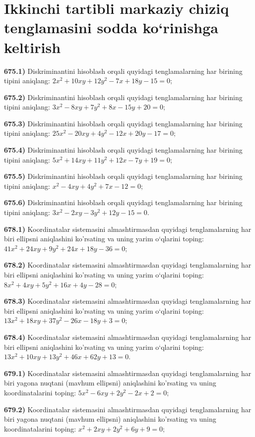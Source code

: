 \section{Ikkinchi tartibli markaziy chiziq tenglamasini sodda ko‘rinishga keltirish}



\textbf{675.1)} Diskriminantini hisoblash orqali quyidagi tenglamalarning har birining tipini aniqlang: $2 x^2+10 x y+12 y^2-7 x+18 y-15=0$;

\textbf{675.2)} Diskriminantini hisoblash orqali quyidagi tenglamalarning har birining tipini aniqlang: $3 x^2-8 x y+7 y^2+8 x-15 y+20=0$;

\textbf{675.3)} Diskriminantini hisoblash orqali quyidagi tenglamalarning har birining tipini aniqlang: $25 x^2-20 x y+4 y^2-12 x+20 y-17=0$;

\textbf{675.4)} Diskriminantini hisoblash orqali quyidagi tenglamalarning har birining tipini aniqlang: $5 x^2+14 x y+11 y^2+12 x-7 y+19=0$;

\textbf{675.5)} Diskriminantini hisoblash orqali quyidagi tenglamalarning har birining tipini aniqlang: $x^2-4 x y+4 y^2+7 x-12=0$;

\textbf{675.6)} Diskriminantini hisoblash orqali quyidagi tenglamalarning har birining tipini aniqlang: $3 x^2-2 x y-3 y^2+12 y-15=0$.

\textbf{678.1)} Koordinatalar sistemasini almashtirmasdan quyidagi tenglamalarning har biri ellipsni aniqlashini ko'rsating va uning yarim o‘qlarini toping: $41 x^2+24 x y+9 y^2+24 x+18 y-36=0$;

\textbf{678.2)} Koordinatalar sistemasini almashtirmasdan quyidagi tenglamalarning har biri ellipsni aniqlashini ko'rsating va uning yarim o‘qlarini toping: $8 x^2+4 x y+5 y^2+16 x+4 y-28=0$;

\textbf{678.3)} Koordinatalar sistemasini almashtirmasdan quyidagi tenglamalarning har biri ellipsni aniqlashini ko'rsating va uning yarim o‘qlarini toping: $13 x^2+18 x y+37 y^2-26 x-18 y+3=0$;

\textbf{678.4)} Koordinatalar sistemasini almashtirmasdan quyidagi tenglamalarning har biri ellipsni aniqlashini ko'rsating va uning yarim o‘qlarini toping: $13 x^2+10 x y+13 y^2+46 x+62 y+13=0$.

\textbf{679.1)} Koordinatalar sistemasini almashtirmasdan quyidagi tenglamalarning har biri yagona nuqtani (mavhum ellipsni) aniqlashini ko'rsating va uning koordinatalarini toping: $5 x^2-6 x y+2 y^2-2 x+2=0$;

\textbf{679.2)} Koordinatalar sistemasini almashtirmasdan quyidagi tenglamalarning har biri yagona nuqtani (mavhum ellipsni) aniqlashini ko'rsating va uning koordinatalarini toping: $x^2+2 x y+2 y^2+6 y+9=0$;


